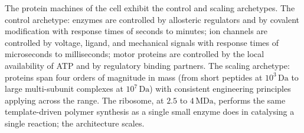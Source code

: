 \begin{archetype}
The protein machines of the cell exhibit the control and scaling
archetypes. The control archetype: enzymes are controlled by
allosteric regulators and by covalent modification with response
times of seconds to minutes; ion channels are controlled by voltage,
ligand, and mechanical signals with response times of microseconds
to milliseconds; motor proteins are controlled by the local availability
of ATP and by regulatory binding partners. The scaling archetype:
proteins span four orders of magnitude in mass (from short peptides at
$10^3\,\text{Da}$ to large multi-subunit complexes at
$10^7\,\text{Da}$) with consistent engineering principles applying
across the range. The ribosome, at $2.5$ to $4\,\text{MDa}$, performs
the same template-driven polymer synthesis as a single small enzyme
does in catalysing a single reaction; the architecture scales.
\end{archetype}

